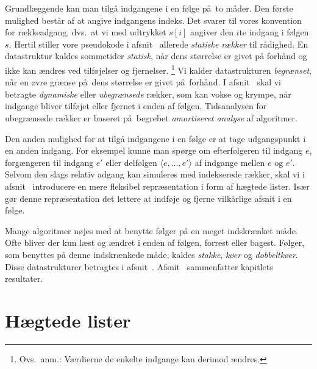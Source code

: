 Grundlæggende kan man tilgå indgangene i en følge på to måder.
Den første mulighed består af at angive indgangens indeks.
Det svarer til vores konvention for rækkeadgang,
dvs.\ at vi med udtrykket $s[i]$ angiver den $i$te indgang i følgen $s$.
Hertil stiller vore pseudokode i afsnit~ allerede \emph{statiske rækker} til rådighed.
En datastruktur kaldes sommetider \emph{statisk}, 
når dens størrelse er givet på forhånd og ikke kan ændres ved tilføjelser og fjernelser.%
\footnote{Ovs.\ anm.: Værdierne de enkelte indgange kan derimod ændres.}
Vi kalder datastrukturen \emph{begrænset},
  når en øvre grænse på dens størrelse er givet på forhånd.
I afsnit~ skal vi betragte \emph{dynamiske} eller \emph{ubegrænsede} rækker,
som kan vokse og krympe, når indgange bliver tilføjet eller fjernet i enden af følgen.
Tidsanalysen for ubegrænsede rækker er baseret på begrebet \emph{amortiseret analyse} af algoritmer.

Den anden mulighed for at tilgå indgangene i en følge er at tage udgangspunkt i en anden indgang.
For eksempel kunne man spørge om efterfølgeren til indgang $e$,
forgængeren til indgang $e'$ 
eller delfølgen $\langle e,\ldots, e'\rangle$ af indgange mellen $e$ og $e'$.
Selvom den slags relativ adgang kan simuleres med indekserede rækker, skal vi i afsnit~ introducere en mere fleksibel repræsentation i form af hægtede lister.
Især gør denne repræsentation det lettere at indføje
og fjerne
vilkårlige afsnit i en følge.

Mange algoritmer nøjes med at benytte følger på en meget indskrænket måde.
Ofte bliver der kun læst og ændret i enden af følgen, forrest eller bagest.
Følger, som benyttes på denne indskrænkede måde, kaldes \emph{stakke}, \emph{køer} og \emph{dobbeltkøer}.
Disse datastrukturer betragtes i afsnit~.
Afsnit~ sammenfatter kapitlets resultater.

\section{Hægtede lister}

\newcommand{\friListe}{\Id{friListe}}

